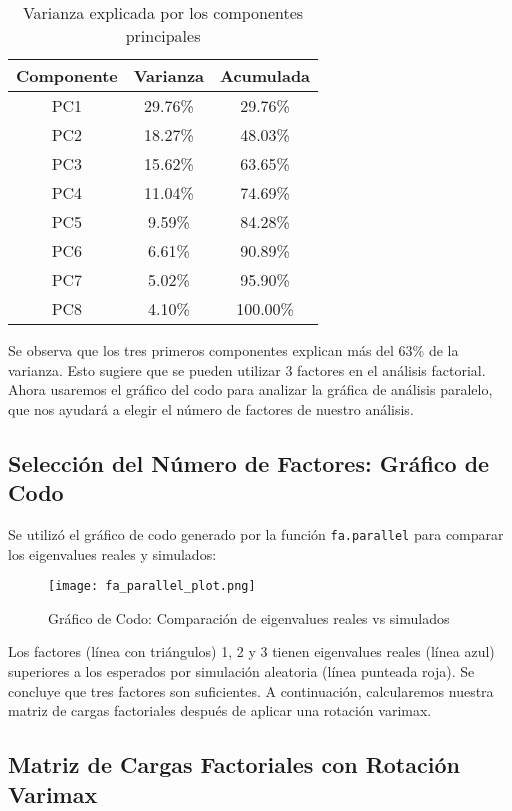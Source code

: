 \documentclass[12pt]{report}
\begin{document}
\begin{table}[H]
\centering
\begin{tabular}{|c|c|c|}
\hline
\textbf{Componente} & \textbf{Varianza} & \textbf{Acumulada} \\
\hline
PC1 & 29.76\% & 29.76\% \\
PC2 & 18.27\% & 48.03\% \\
PC3 & 15.62\% & 63.65\% \\
PC4 & 11.04\% & 74.69\% \\
PC5 & 9.59\% & 84.28\% \\
PC6 & 6.61\% & 90.89\% \\
PC7 & 5.02\% & 95.90\% \\
PC8 & 4.10\% & 100.00\% \\
\hline
\end{tabular}
\caption{Varianza explicada por los componentes principales}
\end{table}

\noindent Se observa que los tres primeros componentes explican más del 63\% de la varianza. Esto sugiere que se pueden utilizar 3 factores en el análisis factorial. Ahora usaremos el gráfico del codo para analizar la gráfica de análisis paralelo, que nos ayudará a elegir el número de factores de nuestro análisis.

\subsection{Selección del Número de Factores: Gráfico de Codo}
Se utilizó el gráfico de codo generado por la función \texttt{fa.parallel} para comparar los eigenvalues reales y simulados:

\begin{figure}[H]
    \centering
    \texttt{[image: fa\_parallel\_plot.png]}
    \caption{Gráfico de Codo: Comparación de eigenvalues reales vs simulados}
\end{figure}

\noindent Los factores (línea con triángulos) 1, 2 y 3 tienen eigenvalues reales (línea azul) superiores a los esperados por simulación aleatoria (línea punteada roja). Se concluye que tres factores son suficientes. A continuación, calcularemos nuestra matriz de cargas factoriales después de aplicar una rotación varimax.

\subsection{Matriz de Cargas Factoriales con Rotación Varimax}
\end{document}
